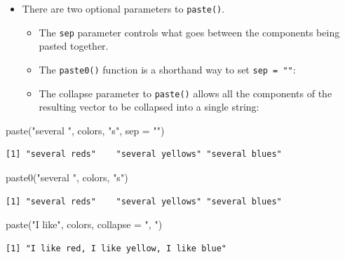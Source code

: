 \documentclass[
  9pt,
  a4paper,
  ignorenonframetext,
  notheorems]{beamer}
\newenvironment{Shaded}{\begin{snugshade}}{\end{snugshade}}
\newcommand{\AttributeTok}[1]{\textcolor[rgb]{0.40,0.45,0.13}{#1}}
\newcommand{\FunctionTok}[1]{\textcolor[rgb]{0.28,0.35,0.67}{#1}}
\newcommand{\NormalTok}[1]{\textcolor[rgb]{0.00,0.23,0.31}{#1}}
\newcommand{\StringTok}[1]{\textcolor[rgb]{0.13,0.47,0.30}{#1}}
\providecommand{\tightlist}{%
  \setlength{\itemsep}{0pt}\setlength{\parskip}{0pt}}\usepackage{longtable,booktabs,array}
\begin{document}
\begin{frame}[fragile]
\begin{itemize}
\tightlist
\item
  There are two optional parameters to \texttt{paste()}.

  \begin{itemize}
  \tightlist
  \item
    The \texttt{sep} parameter controls what goes between the components
    being pasted together.
  \item
    The \texttt{paste0()} function is a shorthand way to set
    \texttt{sep\ =\ ""}:
  \item
    The collapse parameter to \texttt{paste()} allows all the components
    of the resulting vector to be collapsed into a single string:
  \end{itemize}
\end{itemize}

\begin{Shaded}
\begin{Highlighting}[]
\FunctionTok{paste}\NormalTok{(}\StringTok{"several "}\NormalTok{, colors, }\StringTok{"s"}\NormalTok{, }\AttributeTok{sep =} \StringTok{""}\NormalTok{)}
\end{Highlighting}
\end{Shaded}

\begin{verbatim}
[1] "several reds"    "several yellows" "several blues"  
\end{verbatim}

\begin{Shaded}
\begin{Highlighting}[]
\FunctionTok{paste0}\NormalTok{(}\StringTok{"several "}\NormalTok{, colors, }\StringTok{"s"}\NormalTok{)}
\end{Highlighting}
\end{Shaded}

\begin{verbatim}
[1] "several reds"    "several yellows" "several blues"  
\end{verbatim}

\begin{Shaded}
\begin{Highlighting}[]
\FunctionTok{paste}\NormalTok{(}\StringTok{"I like"}\NormalTok{, colors, }\AttributeTok{collapse =} \StringTok{", "}\NormalTok{)}
\end{Highlighting}
\end{Shaded}

\begin{verbatim}
[1] "I like red, I like yellow, I like blue"
\end{verbatim}
\end{frame}
\end{document}
